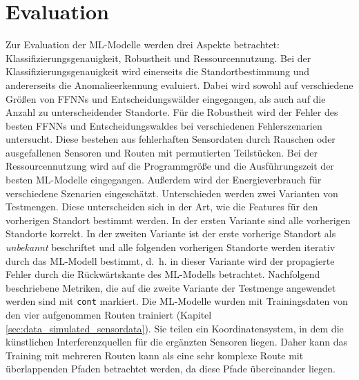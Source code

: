 \chapter{Evaluation}
Zur Evaluation der ML-Modelle werden drei Aspekte betrachtet: Klassifizierungsgenauigkeit, Robustheit und Ressourcennutzung.
Bei der Klassifizierungsgenauigkeit wird einerseits die Standortbestimmung und andererseits die Anomalieerkennung evaluiert.
Dabei wird sowohl auf verschiedene Größen von FFNNs und Entscheidungswälder eingegangen,
als auch auf die Anzahl zu unterscheidender Standorte.
Für die Robustheit wird der Fehler des besten FFNNs und Entscheidungswaldes bei verschiedenen Fehlerszenarien untersucht.
Diese bestehen aus fehlerhaften Sensordaten durch Rauschen oder ausgefallenen Sensoren und Routen mit permutierten Teilstücken.
Bei der Ressourcennutzung wird auf die Programmgröße und die Ausführungszeit der besten ML-Modelle eingegangen.
Außerdem wird der Energieverbrauch für verschiedene Szenarien eingeschätzt.
\newline
\newline
Unterschieden werden zwei Varianten von Testmengen.
Diese unterscheiden sich in der Art, wie die Features für den vorherigen Standort bestimmt werden.
In der ersten Variante sind alle vorherigen Standorte korrekt.
In der zweiten Variante ist der erste vorherige Standort als \textit{unbekannt} beschriftet und alle folgenden vorherigen Standorte werden iterativ durch das ML-Modell bestimmt,
d.~h. in dieser Variante wird der propagierte Fehler durch die Rückwärtskante des ML-Modells betrachtet.
Nachfolgend beschriebene Metriken, die auf die zweite Variante der Testmenge angewendet werden sind mit \texttt{cont} markiert.
\newline
\newline
Die ML-Modelle wurden mit Trainingsdaten von den vier aufgenommen Routen trainiert (Kapitel \ref{sec:data_simulated_sensordata}).
Sie teilen ein Koordinatensystem, in dem die künstlichen Interferenzquellen für die ergänzten Sensoren liegen.
Daher kann das Training mit mehreren Routen kann als eine sehr komplexe Route mit überlappenden Pfaden betrachtet werden,
da diese Pfade übereinander liegen.










